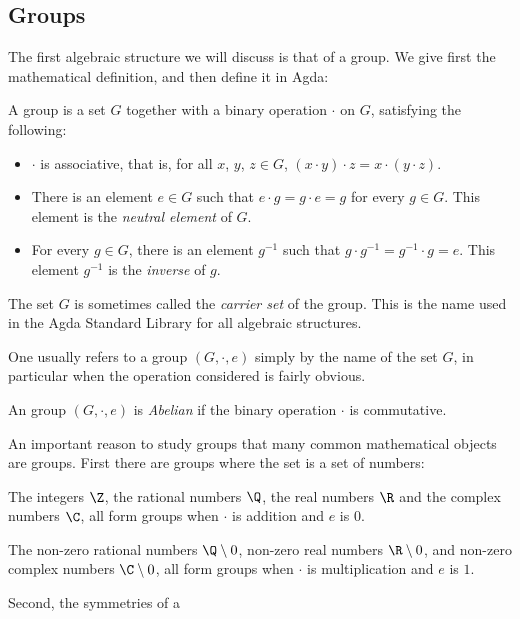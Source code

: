 \subsection{Groups}
The first algebraic structure we will discuss is that of a group. We give first the mathematical definition, and then define it in Agda:
\begin{Definition}
A group is a set $G$ together with a binary operation $\cdot$ on $G$, satisfying the following:
\begin{itemize}
\item $\cdot$ is associative, that is, for all $x$, $y$, $z \in G$, $(x \cdot y) \cdot z = x \cdot (y \cdot z)$. 
\item There is an element $e \in G$ such that $e \cdot g = g \cdot e = g$ for every $g \in G$. This element is the \emph{neutral element} of $G$.
\item For every $g \in G$, there is an element $g^{-1}$ such that $g \cdot g^{-1} = g^{-1} \cdot g = e$. This element $g^{-1}$ is the \emph{inverse} of $g$.
\end{itemize}
\end{Definition}
\begin{Remark}
The set $G$ is sometimes called the \emph{carrier set} of the group. This is the name used in the Agda Standard Library for all algebraic structures.
\end{Remark}
\begin{Remark}
One usually refers to a group $(G, \cdot, e)$ simply by the name of the set $G$, in particular when the operation considered is fairly obvious.
\end{Remark}
\begin{Definition}
An group $(G, \cdot, e)$ is \emph{Abelian} if the binary operation $\cdot$ is commutative.
\end{Definition}
An important reason to study groups that many common mathematical objects are groups. First there are groups where the set is a set of numbers:
\begin{Example}
  The integers $\Z$, the rational numbers $\Q$, the real numbers $\R$ and the complex numbers $\C$, all form groups when $\cdot$ is addition and $e$ is $0$.
\end{Example}
\begin{Example}
  The non-zero rational numbers $\Q\setminus{0}$, non-zero real numbers $\R\setminus{0}$, and non-zero complex numbers $\C\setminus{0}$, all form groups when $\cdot$ is multiplication and $e$ is $1$.
\end{Example}
Second, the symmetries of a 



